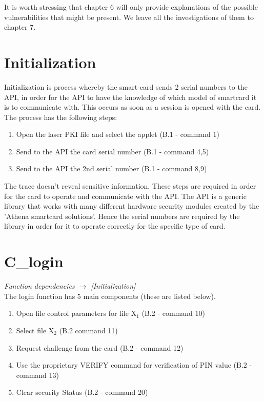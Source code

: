 \documentclass[bsc,frontabs,twoside,singlespacing,parskip,deptreport]{infthesis}     %
\begin{document}
It is worth stressing that chapter 6 will only provide explanations of the possible vulnerabilities that might be present. We leave all the investigations of them to chapter 7.


\section{Initialization}

Initialization is process whereby the smart-card sends 2 serial numbers to the API, in order for the API to have the knowledge of which model of smartcard it is to communicate with. This occurs as soon as a session is opened with the card. The process has the following steps:
\begin{enumerate}
\item Open the laser PKI file and select the applet (B.1 - command 1)
\item Send to the API the card serial number (B.1 - command 4,5)
\item Send to the API the 2nd serial number (B.1 - command 8,9)
\end{enumerate}

The trace doesn't reveal sensitive information. These steps are required in order for the card to operate and communicate with the API. The API is a generic library that works with many different hardware security modules created by the 'Athena smartcard solutions'. Hence the serial numbers are required by the library in order for it to operate correctly for the specific type of card.

\section{C\_login}

\textit{Function dependencies $\rightarrow$ [Initialization]}\\


The login function has 5 main components (these are listed below). 

\begin{enumerate}
\item Open file control parameters for file X$_1$ (B.2 - command 10)
\item Select file X$_2$ (B.2 command 11)
\item Request challenge from the card (B.2 - command 12)
\item Use the proprietary VERIFY command for verification of PIN value (B.2 - command 13)
\item Clear security Status (B.2 - command 20)\\
\end{enumerate}
\end{document}
